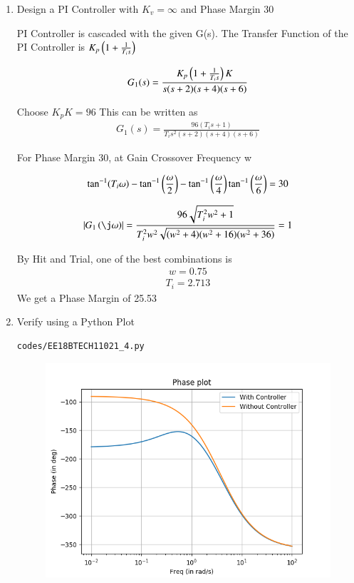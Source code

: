 \begin{enumerate}[label=\thesection.\arabic*.,ref=\thesection.\theenumi]
\item
Design a PI Controller with $K_{v} = \infty$ and Phase Margin 30\degree

\solution
PI Controller is cascaded with the given G(s).
The Transfer Function of the PI Controller is $K_{p}\left(1 + \frac{1}{T_{i}s}\right)$

\begin{align}
    G_{1}(s) = \frac{K_{p}\left(1 +  \frac{1}{T_{i}s}\right)K}{s(s+2)(s+4)(s+6)}
\end{align}

Choose $K_{p}K = 96$
This can be written as
\begin{align}
    G_{1}(s) = \frac{96(T_{i}s + 1)}{T_{i}s^2(s+2)(s+4)(s+6)}
\end{align}

For Phase Margin 30\degree, at Gain Crossover Frequency w

\begin{align}
    \tan^{-1}(T_{i}\omega) - \tan^{-1}\left(\frac{\omega}{2}\right) - \tan^{-1}\left(\frac{\omega}{4}\right)
    \tan^{-1}\left(\frac{\omega}{6}\right) = 30
\end{align}

\begin{align}
    \abs{G_{1}\brak{\j\omega}} = \frac{96\sqrt{T_{i}^2w^2 + 1}}{T_{i}^2w^2\sqrt{(w^2+4)(w^2 + 16)(w^2 + 36)}} = 1
\end{align}

By Hit and Trial, one of the best combinations is
\begin{align}
    w = 0.75
\end{align}
\begin{align}
    T_{i} = 2.713
\end{align}
We get a Phase Margin of 25.53\degree

\item
Verify using a Python Plot

\solution
\begin{lstlisting}
codes/EE18BTECH11021_4.py
\end{lstlisting}

\begin{figure}
\centering
\includegraphics[width=\columnwidth]{figs/EE18BTECH11021_PI.png}
\end{figure}


\end{enumerate}
